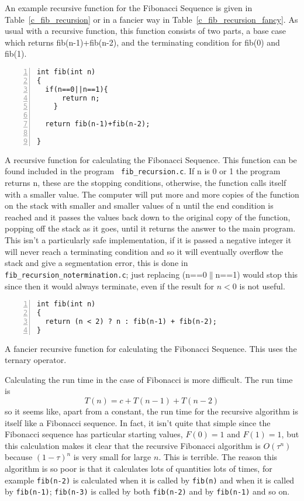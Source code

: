 \documentclass[11pt,a4paper]{scrartcl}
\begin{document}
An example recursive function for the Fibonacci Sequence is given in
Table~\ref{c_fib_recursion} or in a fancier way in
Table~\ref{c_fib_recursion_fancy}.  As usual with a recursive
function, this function consists of two parts, a base case which
returns fib(n-1)+fib(n-2), and the terminating condition for fib(0)
and fib(1).

\begin{table}
\begin{lstlisting}[numbers=left]
int fib(int n)
{
  if(n==0||n==1){
      return n;
    }

  return fib(n-1)+fib(n-2);

}
\end{lstlisting}
\caption{A recursive function for calculating the Fibonacci
  Sequence. This function can be found included in the program {\tt
    fib\_recursion.c}. If n is 0 or 1 the program returns n, these are
  the stopping conditions, otherwise, the function calls itself with a
  smaller value. The computer will put more and more copies of the
  function on the stack with smaller and smaller values of n until the
  end condition is reached and it passes the values back down to the
  original copy of the function, popping off the stack as it goes,
  until it returns the answer to the main program. This isn't a
  particularly safe implementation, if it is passed a negative integer
  it will never reach a terminating condition and so it will
  eventually overflow the stack and give a segmentation error, this is
  done in {\tt fib\_recursion\_no\-termination.c}; just replacing
  (n==0$\|$n==1) would stop this since then it would always terminate,
  even if the result for $n<0$ is not useful.\label{c_fib_recursion}}
\end{table}


\begin{table}
\begin{lstlisting}[numbers=left]
int fib(int n)
{
  return (n < 2) ? n : fib(n-1) + fib(n-2); 
}
\end{lstlisting}
\caption{A fancier recursive function for calculating the Fibonacci Sequence. This uses the ternary operator. \label{c_fib_recursion_fancy}}
\end{table}

Calculating the run time in the case of Fibonacci is more
difficult. The run time is
\begin{equation}
T(n)=c+T(n-1)+T(n-2)
\end{equation}
so it seems like, apart from a constant, the run time for the
recursive algorithm is itself like a Fibonacci sequence. In fact, it
isn't quite that simple since the Fibonacci sequence has particular
starting values, $F(0)=1$ and $F(1)=1$, but this calculation makes it
clear that the recursive Fibonacci algorithm is $O(\tau^n)$ because
$(1-\tau)^n$ is very small for large $n$. This is terrible. The reason
this algorithm is so poor is that it calculates lots of quantities
lots of times, for example \texttt{fib(n-2)} is calculated when it is
called by \texttt{fib(n)} and when it is called by \texttt{fib(n-1)};
\texttt{fib(n-3)} is called by both \texttt{fib(n-2)} and by \texttt{fib(n-1)}
and so on.
\end{document}
